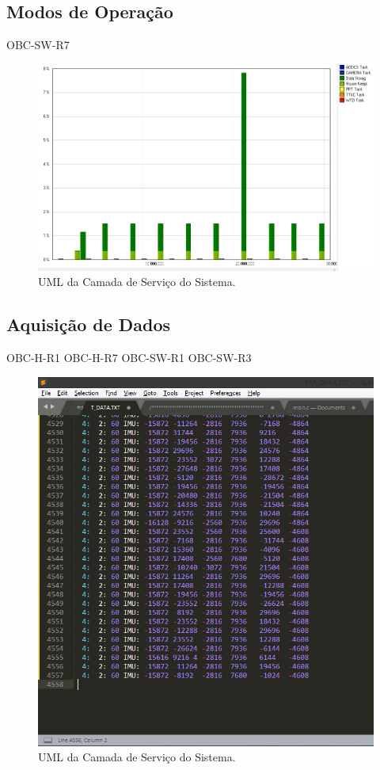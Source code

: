 \subsection{Modos de Operação}
OBC-SW-R7

\begin{figure}[h]
	\centering
	\includegraphics[keepaspectratio=true,scale=0.72]{figuras/trace_snapshoot.png}
	\caption{UML da Camada de Serviço do Sistema.}
	\label{uml_CSS}
\end{figure}

\subsection{Aquisição de Dados}
OBC-H-R1
OBC-H-R7
OBC-SW-R1
OBC-SW-R3

\begin{figure}[h]
	\centering
	\includegraphics[keepaspectratio=true,scale=0.70]{figuras/telemetryData.PNG}
	\caption{UML da Camada de Serviço do Sistema.}
	\label{uml_CSS}
\end{figure}

